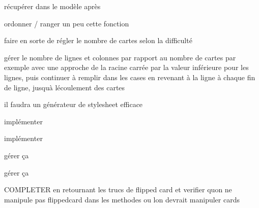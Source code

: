 
\begin{DoxyRefList}
\item[\label{todo__todo000004}%
\Hypertarget{todo__todo000004}%
Member \hyperlink{class_memory_a7c8b57775899a3782edcdf4da430ad61}{Memory\+:\+:get\+Nb\+Cards} (void)]récupérer dans le modèle après  
\item[\label{todo__todo000001}%
\Hypertarget{todo__todo000001}%
Member \hyperlink{class_memory_a243eef3e0fd8d02131e3bcca0471c931}{Memory\+:\+:Memory} (Q\+Widget $\ast$parent=0)]ordonner / ranger un peu cette fonction 

faire en sorte de régler le nombre de cartes selon la difficulté 

gérer le nombre de lignes et colonnes par rapport au nombre de cartes par exemple avec une approche de la racine carrée par la valeur inférieure pour les lignes, puis continuer à remplir dans les cases en revenant à la ligne à chaque fin de ligne, jusqu\textquotesingle{}à l\textquotesingle{}écoulement des cartes  
\item[\label{todo__todo000005}%
\Hypertarget{todo__todo000005}%
Class \hyperlink{class_memory_index_cards}{Memory\+Index\+Cards} ]il faudra un générateur de stylesheet efficace  
\item[\label{todo__todo000006}%
\Hypertarget{todo__todo000006}%
Member \hyperlink{class_memory_index_cards_a10ae71958cd423edde68dc41dd010a66}{Memory\+Index\+Cards\+:\+:Memory\+Index\+Cards} (std\+::string \&pathcsv)]implémenter  
\item[\label{todo__todo000009}%
\Hypertarget{todo__todo000009}%
Member \hyperlink{class_mod_calcul_aa16185334bb48c8e312bd0b9148aa00d}{Mod\+Calcul\+:\+:get\+Ope1\+Str} (void)]implémenter  
\item[\label{todo__todo000008}%
\Hypertarget{todo__todo000008}%
Member \hyperlink{class_mod_calcul_ad6061decce032f0debf6fa79d153df5d}{Mod\+Calcul\+:\+:ini\+Set\+Operateurs} (pos\+Set\+Op set\+Op)]gérer ça 

gérer ça  
\item[\label{todo__todo000012}%
\Hypertarget{todo__todo000012}%
Member \hyperlink{class_mod_memory_a4e6581fef7b3adbad429bf4c39d38e88}{Mod\+Memory\+:\+:close\+Cards} (void)]C\+O\+M\+P\+L\+E\+T\+ER en retournant les trucs de flipped card et verifier qu\textquotesingle{}on ne manipule pas flippedcard dans les methodes ou l\textquotesingle{}on devrait manipuler cards


\end{DoxyRefList}
